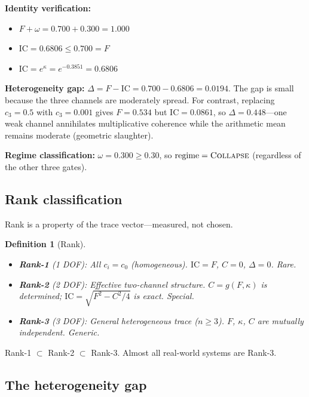 \documentclass[
  aps,
  prd,
  twocolumn,
  superscriptaddress,
  nofootinbib,
  floatfix
]{revtex4-2}
\newtheorem{definition}[theorem]{Definition}
\newcommand{\regime}[1]{\textrm{\upshape\scshape#1}}
\newcommand{\IC}{\mathrm{IC}}
\begin{document}
\noindent\textbf{Identity verification:}
\begin{itemize}[leftmargin=*]
\item $F + \omega = 0.700 + 0.300 = 1.000$ \quad\checkmark
\item $\IC = 0.6806 \leq 0.700 = F$ \quad\checkmark
\item $\IC = e^\kappa = e^{-0.3851} = 0.6806$ \quad\checkmark
\end{itemize}

\noindent\textbf{Heterogeneity gap:}
$\Delta = F - \IC = 0.700 - 0.6806 = 0.0194$.  The gap is
small because the three channels are moderately spread.  For
contrast, replacing $c_3 = 0.5$ with $c_3 = 0.001$
gives $F = 0.534$ but $\IC = 0.0861$, so
$\Delta = 0.448$---one weak channel annihilates
multiplicative coherence while the arithmetic mean remains
moderate (geometric slaughter).

\noindent\textbf{Regime classification:}
$\omega = 0.300 \geq 0.30$, so
$\mathrm{regime} = \regime{Collapse}$
(regardless of the other three gates).

\subsection{Rank classification}

Rank is a property of the trace vector---measured, not
chosen.

\begin{definition}[Rank]
\label{def:rank}
\begin{itemize}[leftmargin=*]
\item \textbf{Rank-1} (1 DOF): All $c_i = c_0$ (homogeneous).
  $\IC = F$, $C = 0$, $\Delta = 0$.  Rare.
\item \textbf{Rank-2} (2 DOF): Effective two-channel structure.
  $C = g(F, \kappa)$ is determined; $\IC = \sqrt{F^2 - C^2/4}$
  is exact.  Special.
\item \textbf{Rank-3} (3 DOF): General heterogeneous trace
  ($n \geq 3$). $F$, $\kappa$, $C$ are mutually independent.
  Generic.
\end{itemize}
\end{definition}

\noindent Rank-1 $\subset$ Rank-2 $\subset$ Rank-3.  Almost all
real-world systems are Rank-3.

\subsection{The heterogeneity gap}
\end{document}
